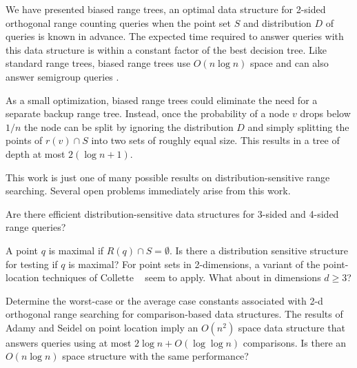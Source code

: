 \documentclass[lotsofwhite,charterfonts]{patmorin}
\begin{document}
We have presented biased range trees, an optimal data structure for
2-sided orthogonal range counting queries when the point set $S$ and
distribution $D$ of queries is known in advance. The expected time
required to answer queries with this data structure is within a
constant factor of the best decision tree.  Like standard range trees,
biased range trees use $O(n\log n)$ space and can also answer
semigroup queries \cite{semigroup}.

As a small optimization, biased range trees could eliminate the need
for a separate backup range tree. Instead, once the probability of a
node $v$ drops below $1/n$ the node can be split by ignoring the
distribution $D$ and simply splitting the points of $r(v)\cap S$ into
two sets of roughly equal size.  This results in a tree of depth at
most $2(\log n+1)$.

This work is just one of many possible results on
distribution-sensitive range searching.  Several open problems
immediately arise from this work.

\begin{op}
Are there efficient distribution-sensitive data structures for 3-sided
and 4-sided range queries?
\end{op}

\begin{op}
A point $q$ is maximal if $R(q)\cap S=\emptyset$.  Is there a distribution
sensitive structure for testing if $q$ is maximal?  For point sets in
2-dimensions,
a variant of the point-location techniques of Collette \etal\
\cite{cXX} seem to apply.  What about in dimensions $d\ge 3$?
\end{op}

\begin{op}
Determine the worst-case or the average case constants associated with
2-d orthogonal range searching for comparison-based data structures.
The results of Adamy and Seidel on point location \cite{S} imply an
$O(n^2)$ space data structure that answers queries using at most
$2\log n + O(\log\log n)$ comparisons.  Is there an $O(n\log n)$ space
structure with the same performance?
\end{op}



\end{document}
